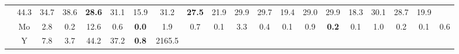 \documentclass[french,10pt]{article}
\begin{document}
\begin{landscape}
\begin{longtable}{ l  c | c c c | c c c | c c c | c c c | c c c | c c c | }
                    &                     44.3
     & {\footnotesize     34.7
    } & {\footnotesize     38.6
     }
    
    
                    &                     \textbf{ 28.6}
     & {\footnotesize     31.1
    } & {\footnotesize     15.9
     }
    
    
                    &                     31.2
     & {\footnotesize     \textbf{ 27.5}
    } & {\footnotesize     21.9
     }
    
    
                    &                     29.9
     & {\footnotesize     29.7
    } & {\footnotesize     19.4
     }
    
    
                    &                     29.0
     & {\footnotesize     29.9
    } & {\footnotesize     18.3
     }
    
    
                    &                     30.1
     & {\footnotesize     28.7
    } & {\footnotesize     19.9
     }
    
    
                    \\*
                        & {\small Mo  }

                    &                     2.8
     & {\footnotesize     0.2
    } & {\footnotesize     12.6
     }
    
    
                    &                     0.6
     & {\footnotesize     \textbf{ 0.0}
    } & {\footnotesize     1.9
     }
    
    
                    &                     0.7
     & {\footnotesize     0.1
    } & {\footnotesize     3.3
     }
    
    
                    &                     0.4
     & {\footnotesize     0.1
    } & {\footnotesize     0.9
     }
    
    
                    &                     \textbf{ 0.2}
     & {\footnotesize     0.1
    } & {\footnotesize     1.0
     }
    
    
                    &                     0.2
     & {\footnotesize     0.1
    } & {\footnotesize     0.6
     }
    
    
                    \\*
                        & {\small Y  }

                    &                     7.8
     & {\footnotesize     3.7
    } & {\footnotesize     44.2
     }
    
    
                    &                     37.2
     & {\footnotesize     \textbf{ 0.8}
    } & {\footnotesize     2165.5
     }
    

\end{longtable}
\end{landscape}
\end{document}
